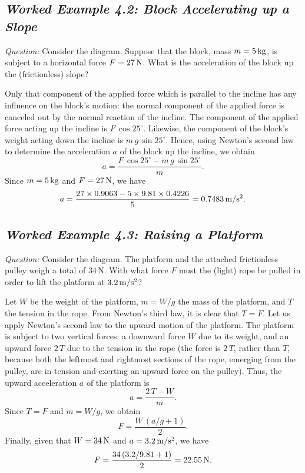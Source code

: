 \begin{figure*}[h]
\epsfysize=1.5in
\centerline{}
\end{figure*}

\subsection*{\em Worked Example 4.2: Block Accelerating up a Slope}
{\em Question:} Consider the diagram. Suppose that the block, mass
$m= 5\,{\rm kg}$, is subject to a horizontal force $F= 27\,{\rm N}$. 
What is the acceleration of the block up the (frictionless) slope?


\begin{figure*}[h]
\epsfysize=1.5in
\centerline{}
\end{figure*}

 Only that component of the applied force which is
parallel to the incline has any influence on the block's motion: the normal
component of the applied force is canceled out by the normal reaction
of the incline. The component of the applied force acting up the
incline is $F\,\cos 25^\circ$. Likewise, the component of the block's
weight acting down the incline is $m\,g\,\sin 25^\circ$. Hence, using
Newton's second law to determine the acceleration $a$ of the block
up the incline, we obtain
$$
a = \frac{F\,\cos 25^\circ - m\,g\,\sin 25^\circ}{m}.
$$
Since $m = 5\,{\rm kg}$ and $F= 27\,{\rm N}$, we have
$$
a = \frac{27\times 0.9063 - 5\times 9.81\times 0.4226}{5} = 0.7483\,{\rm m/s^2}.
$$

\subsection*{\em Worked Example 4.3: Raising a Platform}
{\em Question:} Consider the diagram. The platform and the attached frictionless
pulley weigh a total of 34\,N. With what force $F$ must the (light) rope be pulled
in order to lift the platform at $3.2\,{\rm m/s^2}$? 

\begin{figure*}[h]
\epsfysize=2.5in
\centerline{}
\end{figure*}

 Let $W$ be the weight of the platform, $m=W/g$ the mass
of the platform, and $T$ the tension in the  rope. From Newton's third law, it is clear that $T=F$.
 Let us apply Newton's second law to the upward motion
of the platform. The platform is subject to two vertical forces: a downward
force $W$ due to its  weight, and an upward force $2\,T$ due to
the tension in the rope (the force is $2\,T$, rather than $T$, because both
the leftmost and rightmost sections of the rope, emerging from the pulley,
are in tension and exerting an upward force on the pulley). Thus, the
upward acceleration $a$ of the platform is
$$
a = \frac{2\,T-W}{m}.
$$
Since $T=F$ and $m=W/g$, we obtain
$$
F = \frac{W\,(a/g+1)}{2}.
$$
Finally, given that $W=34\,{\rm N}$ and $a=3.2\,{\rm m/s^2}$, we have
$$
F = \frac{34\,(3.2/9.81+1)}{2} = 22.55\,{\rm N}.
$$

